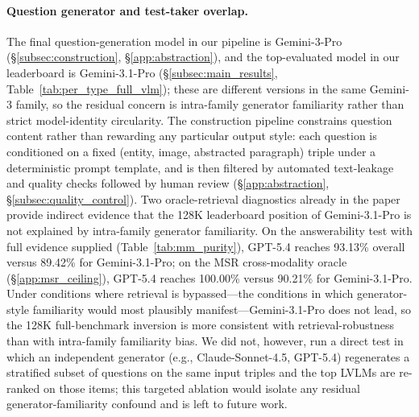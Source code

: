 \documentclass{llmxive}
\begin{document}
\paragraph{Question generator and test-taker overlap.}
The final question-generation model in our pipeline is Gemini-3-Pro (\S\ref{subsec:construction}, \S\ref{app:abstraction}), and the top-evaluated model in our leaderboard is Gemini-3.1-Pro (\S\ref{subsec:main_results}, Table~\ref{tab:per_type_full_vlm}); these are different versions in the same Gemini-3 family, so the residual concern is intra-family generator familiarity rather than strict model-identity circularity. The construction pipeline constrains question content rather than rewarding any particular output style: each question is conditioned on a fixed (entity, image, abstracted paragraph) triple under a deterministic prompt template, and is then filtered by automated text-leakage and quality checks followed by human review (\S\ref{app:abstraction}, \S\ref{subsec:quality_control}). Two oracle-retrieval diagnostics already in the paper provide indirect evidence that the 128K leaderboard position of Gemini-3.1-Pro is not explained by intra-family generator familiarity. On the answerability test with full evidence supplied (Table~\ref{tab:mm_purity}), GPT-5.4 reaches 93.13\% overall versus 89.42\% for Gemini-3.1-Pro; on the MSR cross-modality oracle (\S\ref{app:msr_ceiling}), GPT-5.4 reaches 100.00\% versus 90.21\% for Gemini-3.1-Pro. Under conditions where retrieval is bypassed---the conditions in which generator-style familiarity would most plausibly manifest---Gemini-3.1-Pro does not lead, so the 128K full-benchmark inversion is more consistent with retrieval-robustness than with intra-family familiarity bias. We did not, however, run a direct test in which an independent generator (e.g., Claude-Sonnet-4.5, GPT-5.4) regenerates a stratified subset of questions on the same input triples and the top LVLMs are re-ranked on those items; this targeted ablation would isolate any residual generator-familiarity confound and is left to future work.
\end{document}
